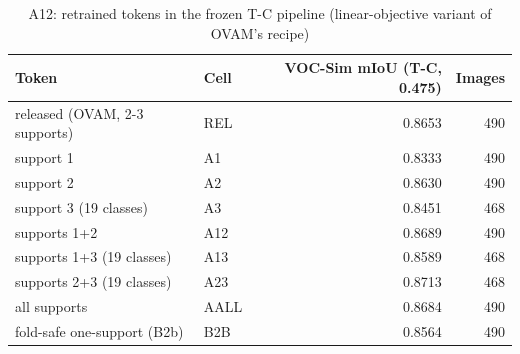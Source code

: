 \begin{table}[H]\centering\scriptsize\setlength{\tabcolsep}{3pt}
\begin{tabular}{>{\raggedright\arraybackslash}p{5.91cm}>{\raggedright\arraybackslash}p{1.40cm}rr}
\toprule
Token & Cell & VOC-Sim mIoU (T-C, 0.475) & Images \\
\midrule
released (OVAM, 2-3 supports) & REL & 0.8653 & 490 \\
support 1 & A1 & 0.8333 & 490 \\
support 2 & A2 & 0.8630 & 490 \\
support 3 (19 classes) & A3 & 0.8451 & 468 \\
supports 1+2 & A12 & 0.8689 & 490 \\
supports 1+3 (19 classes) & A13 & 0.8589 & 468 \\
supports 2+3 (19 classes) & A23 & 0.8713 & 468 \\
all supports & AALL & 0.8684 & 490 \\
fold-safe one-support (B2b) & B2B & 0.8564 & 490 \\
\bottomrule
\end{tabular}
\caption{A12: retrained tokens in the frozen T-C pipeline (linear-objective variant of OVAM's recipe)}\label{tab:a12_token_learning}
\end{table}
